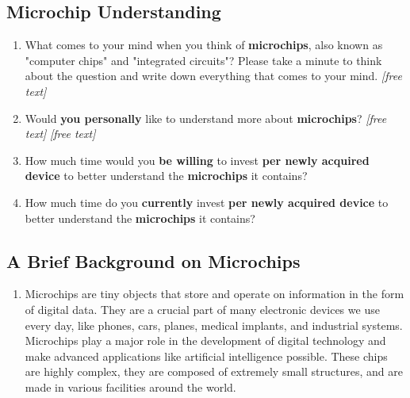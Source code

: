 \subsection{Microchip Understanding}
\label{xhw_study::subapp::understanding}
\begin{enumerate}
    \setcounter{enumi}{\value{qcounter}}
    \item \label{xhw_study::question::perception}
        What comes to your mind when you think of \textbf{microchips}, also known as "computer chips" and "integrated circuits"? Please take a minute to think about the question and write down everything that comes to your mind.  \textit{[free text]}
    \item \label{xhw_study::question::understand_more}
        Would \textbf{you personally} like to understand more about \textbf{microchips}? 
         \textit{[free text]}
         \textit{[free text]}
    \item \label{xhw_study::question::time_willing_before}
        How much time would you \textbf{be willing} to invest \textbf{per newly acquired device} to better understand the \textbf{microchips} it contains?
    \item \label{xhw_study::question::time_actual}
        How much time do you \textbf{currently} invest \textbf{per newly acquired device} to better understand the \textbf{microchips} it contains?
    \setcounter{qcounter}{\value{enumi}}
\end{enumerate}

\subsection{A Brief Background on Microchips}
\label{xhw_study::subapp::background}
\begin{enumerate}
    \setcounter{enumi}{\value{qcounter}}
    \item \label{xhw_study::question::background}
        Microchips are tiny objects that store and operate on information in the form of digital data. They are a crucial part of many electronic devices we use every day, like phones, cars, planes, medical implants, and industrial systems. Microchips play a major role in the development of digital technology and make advanced applications like artificial intelligence possible. These chips are highly complex, they are composed of extremely small structures, and are made in various facilities around the world.
    \setcounter{qcounter}{\value{enumi}}
\end{enumerate}

